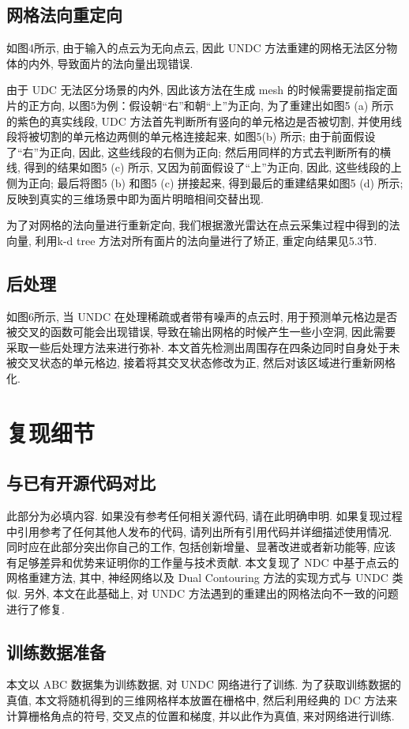 \subsection{网格法向重定向}
如图4所示, 由于输入的点云为无向点云, 因此 UNDC 方法重建的网格无法区分物体的内外, 导致面片的法向量出现错误. 

由于 UDC 无法区分场景的内外, 因此该方法在生成 mesh 的时候需要提前指定面片的正方向, 以图5为例：假设朝“右”和朝“上”为正向, 为了重建出如图5 (a) 所示的紫色的真实线段, UDC 方法首先判断所有竖向的单元格边是否被切割, 并使用线段将被切割的单元格边两侧的单元格连接起来, 如图5(b) 所示; 由于前面假设了“右”为正向, 因此, 这些线段的右侧为正向; 然后用同样的方式去判断所有的横线, 得到的结果如图5 (c) 所示, 又因为前面假设了“上”为正向, 因此, 这些线段的上侧为正向; 最后将图5 (b) 和图5 (c) 拼接起来, 得到最后的重建结果如图5 (d) 所示; 反映到真实的三维场景中即为面片明暗相间交替出现. 

为了对网格的法向量进行重新定向, 我们根据激光雷达在点云采集过程中得到的法向量, 利用k-d tree 方法对所有面片的法向量进行了矫正, 重定向结果见5.3节. 

\subsection{后处理}
如图6所示, 当 UNDC 在处理稀疏或者带有噪声的点云时, 用于预测单元格边是否被交叉的函数可能会出现错误, 导致在输出网格的时候产生一些小空洞, 因此需要采取一些后处理方法来进行弥补. 本文首先检测出周围存在四条边同时自身处于未被交叉状态的单元格边, 接着将其交叉状态修改为正, 然后对该区域进行重新网格化. 



\section{复现细节}

\subsection{与已有开源代码对比}
此部分为必填内容. 如果没有参考任何相关源代码, 请在此明确申明. 如果复现过程中引用参考了任何其他人发布的代码, 请列出所有引用代码并详细描述使用情况. 同时应在此部分突出你自己的工作, 包括创新增量、显著改进或者新功能等, 应该有足够差异和优势来证明你的工作量与技术贡献. 
本文复现了 NDC 中基于点云的网格重建方法, 其中, 神经网络以及 Dual Contouring 方法的实现方式与 UNDC 类似. 另外, 本文在此基础上, 对 UNDC 方法遇到的重建出的网格法向不一致的问题进行了修复. 

\subsection{训练数据准备}
本文以 ABC 数据集为训练数据, 对 UNDC 网络进行了训练. 为了获取训练数据的真值, 本文将随机得到的三维网格样本放置在栅格中, 然后利用经典的 DC 方法来计算栅格角点的符号, 交叉点的位置和梯度, 并以此作为真值, 来对网络进行训练. 
